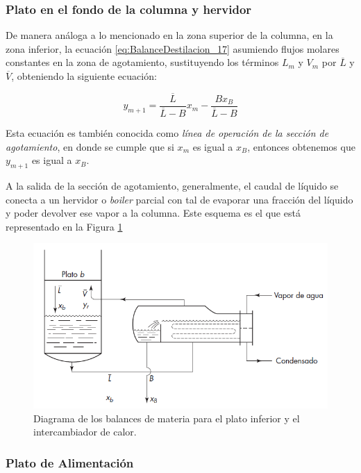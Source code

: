 \documentclass[11pt]{book}
\begin{document}
\subsubsection{Plato en el fondo de la columna y hervidor}

De manera análoga a lo mencionado en la zona superior de la columna, en la zona inferior, la ecuación \ref{eq:BalanceDestilacion_17} asumiendo flujos molares constantes en la zona de agotamiento, sustituyendo los términos $L_m$ y $V_m$ por $\overline{L}$ y $\overline{V}$, obteniendo la siguiente ecuación:

\begin{equation}
    \label{eq:BalanceDestilacion_21}
    y_{m+1} = \frac{\overline{L}}{\overline{L} - B} x_m - \frac{B x_B}{\overline{L} - B}
\end{equation}

Esta ecuación es también conocida como \textit{línea de operación de la sección de agotamiento}, en donde se cumple que si $x_m$ es igual a $x_B$, entonces obtenemos que $y_{m+1}$ es igual a $x_B$.

A la salida de la sección de agotamiento, generalmente, el caudal de líquido se conecta a un hervidor o \textit{boiler} parcial con tal de evaporar una fracción del líquido y poder devolver ese vapor a la columna. Este esquema es el que está representado en la Figura \ref{fig:DestiladorHervidor}

\begin{figure}[H]
    \centering
    \includegraphics{img/destilacion/DestiladorHervidor.PNG}
    \caption{Diagrama de los balances de materia para el plato inferior y el intercambiador de calor.}
    \label{fig:DestiladorHervidor}
\end{figure}

\subsubsection{Plato de Alimentación}
\end{document}
